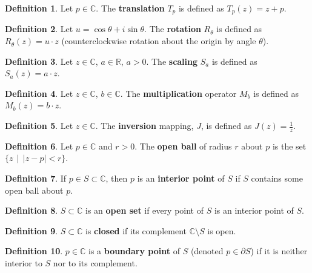 \documentclass[a4paper]{article}
\theoremstyle{definition}
\newtheorem{definition}{Definition}
\begin{document}
	\begin{definition}
		Let $p \in \mathbb{C}$. The \textbf{translation} $T_{p}$ is defined as $T_{p}(z) = z + p$.
	\end{definition}
	
	\begin{definition}
		Let $u = \cos{\theta} + i \sin{\theta}$. The \textbf{rotation} $R_{\theta}$ is defined as $R_{\theta}(z) = u \cdot z$ (counterclockwise rotation about the origin by angle $\theta$).
	\end{definition}
	
	\begin{definition}
		Let $z \in \mathbb{C}$, $a \in \mathbb{R}$, $a > 0$. The \textbf{scaling} $S_{a}$ is defined as $S_{a}(z) = a \cdot z$.
	\end{definition}
	
	\begin{definition}
		Let $z \in \mathbb{C}$, $b \in \mathbb{C}$. The \textbf{multiplication} operator $M_{b}$ is defined as $M_{b}(z) = b \cdot z$.
	\end{definition}
	
	\begin{definition}
		Let $z \in \mathbb{C}$. The \textbf{inversion} mapping, $J$, is defined as $J(z) = \frac{1}{z}$.
	\end{definition}
	
	\begin{definition}
		Let $p \in \mathbb{C}$ and $r > 0$. The \textbf{open ball} of radius $r$ about $p$ is the set $\{z \; \, | \; \, |z-p| < r\}$.
	\end{definition}
	
	\begin{definition}
		If $p \in S \subset \mathbb{C}$, then $p$ is an \textbf{interior point} of $S$ if $S$ contains some open ball about $p$.
	\end{definition}
	
	\begin{definition}
		$S \subset \mathbb{C}$ is an \textbf{open set} if every point of $S$ is an interior point of $S$.
	\end{definition}
	
	\begin{definition}
		$S \subset \mathbb{C}$ is \textbf{closed} if its complement $\mathbb{C} \setminus S$ is open.
	\end{definition}
	
	\begin{definition}
		$p \in \mathbb{C}$ is a \textbf{boundary point} of $S$ (denoted $p \in \partial S$) if it is neither interior to $S$ nor to its complement.
	\end{definition}
	
\end{document}
